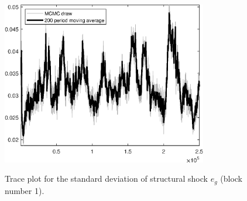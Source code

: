 \begin{figure}[H]
\centering
  \includegraphics[width=0.8\textwidth]{BRS_growth_ext_fd_v1/graphs/TracePlot_SE_e_g_blck_1}\\
    \caption{Trace plot for the standard deviation of structural shock ${e_g}$ (block number 1).}
\end{figure}
